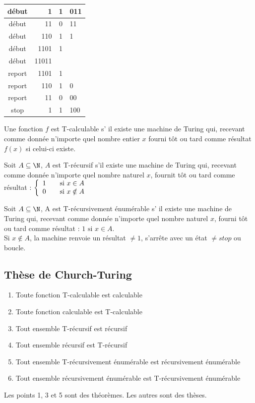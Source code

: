\begin{myexem}
\begin{tabular}{|c|r|c|l|}
 début & 1 & 1 & 011 \\ \hline
 début & 11 & 0 & 11 \\ \hline
 début & 110 & 1 & 1 \\ \hline
 début & 1101 & 1 & \\ \hline
 début & 11011 &  & \\ \hline
 report & 1101 & 1 & \\ \hline
 report & 110 & 1 & 0 \\ \hline
 report & 11 & 0 & 00 \\ \hline
 stop & 1 & 1 & 100 \\ \hline
\end{tabular}

\end{myexem}
\begin{mydef}[T-calculable] Une fonction $f$ est T-calculable s’ il existe une machine
de Turing qui,
	recevant comme donnée n'importe quel nombre entier $x$ fourni tôt ou tard
	comme résultat $f(x)$ si celui-ci existe.
\end{mydef}

\begin{mydef}[T-récursif] Soit $A\subseteq \N$, $A$ est T-récursif s’il existe
	une machine de Turing qui, recevant comme donnée n'importe quel nombre
	naturel $x$, fournit tôt ou tard comme résultat :
	$ \left\{
		\begin{array}{l l}
			1 & \quad \text{si $x\in A$}\\
    		0 & \quad \text{si $x\notin A$}
		\end{array} \right.$
\end{mydef}

\begin{mydef} Soit $A\subseteq \N$, A est
	T-récursivement énumérable s’ il existe
	une machine de Turing qui, recevant comme donnée n'importe quel nombre
	naturel $x$, fourni tôt ou tard comme résultat : $ 1 \text{ si } x \in A$.\\
	Si $x \notin A$, la machine renvoie un résultat $\neq 1$, s'arrête avec un
	état $\neq stop$ ou boucle.
\end{mydef}

\subsection{Thèse de Church-Turing}
\begin{enumerate}
	\item Toute fonction T-calculable est calculable
	\item Toute fonction calculable est T-calculable
	\item Tout ensemble T-récursif est récursif
	\item Tout ensemble récursif est T-récursif
	\item Tout ensemble T-récursivement énumérable est récursivement
		énumérable
	\item Tout ensemble récursivement énumérable est T-récursivement
		énumérable
\end{enumerate}
Les points 1, 3 et 5 sont des théorèmes. Les autres sont des thèses.

